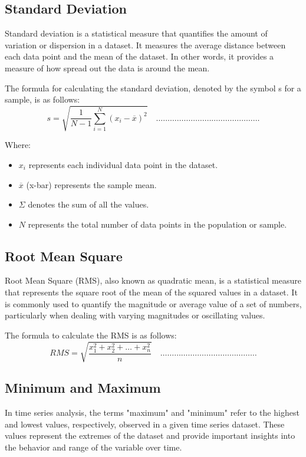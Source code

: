 \renewcommand{\theequation}{Eq (\arabic{equation})}
\subsection{Standard Deviation}
Standard deviation is a statistical measure that quantifies the amount of variation or dispersion in a dataset. It measures the average distance between each data point and the mean of the dataset. In other words, it provides a measure of how spread out the data is around the mean.\par
The formula for calculating the standard deviation, denoted by the symbol s for a sample, is as follows:
\begin{equation}
\label{eq:Standard Deviation}
s = \sqrt{\frac{1}{{N-1}} \sum_{i=1}^{N} (x_i - \overline{x})^2} \quad  \dots \dots \dots \dots \dots \dots \dots \dots \dots \dots \dots \dots \dots \dots \dots
\end{equation}

Where:
\begin{itemize}
    \item $x_i$ represents each individual data point in the dataset.
    \item $\overline{x}$ (x-bar) represents the sample mean.
    \item $\Sigma$ denotes the sum of all the values.
    \item $N$ represents the total number of data points in the population or sample.
\end{itemize}

\subsection{Root Mean Square}
Root Mean Square (RMS), also known as quadratic mean, is a statistical measure that represents the square root of the mean of the squared values in a dataset. It is commonly used to quantify the magnitude or average value of a set of numbers, particularly when dealing with varying magnitudes or oscillating values.\par
The formula to calculate the RMS is as follows:
\begin{equation}
\label{eq: Root Mean Square}
RMS = \sqrt{\frac{{x_1^2 + x_2^2 + \ldots + x_n^2}}{{n}}}  \quad  \dots \dots \dots \dots \dots \dots \dots \dots \dots \dots \dots \dots \dots \dots 
\end{equation}


\subsection{Minimum and Maximum}
In time series analysis, the terms "maximum" and "minimum" refer to the highest and lowest values, respectively, observed in a given time series dataset. These values represent the extremes of the dataset and provide important insights into the behavior and range of the variable over time.

